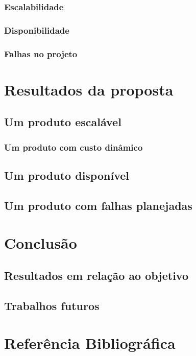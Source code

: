 \documentclass[]{../class/politex}
\begin{document}
      \subsection{Escalabilidade}

      \subsection{Disponibilidade}

      \subsection{Falhas no projeto}

  

  \chapter{Resultados da proposta}

    \section{Um produto escalável}

      \subsection{Um produto com custo dinâmico}

    \section{Um produto disponível}

    \section{Um produto com falhas planejadas}

  \chapter{Conclusão}

    \section{Resultados em relação ao objetivo}

    \section{Trabalhos futuros}

  \chapter{Referência Bibliográfica}
\end{document}
